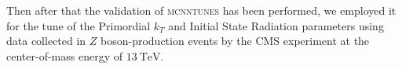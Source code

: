 \medskip

Then after that the validation of \textsc{mcnntunes} has been performed, we employed it for the tune of the Primordial $k_T$ and Initial State Radiation parameters using data collected in $Z$ boson-production events by the CMS experiment at the center-of-mass energy of $13\ \mathrm{TeV}$. 


%
